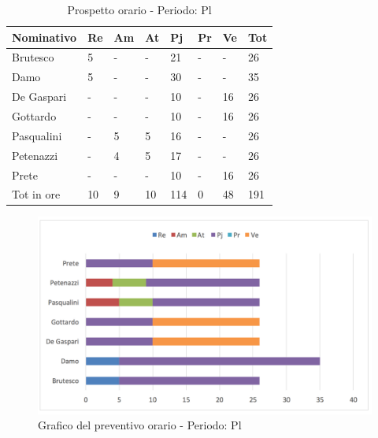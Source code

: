 							\begin{table}[H] \begin{center} \begin{tabular}{llllllll}
							\toprule
							\textbf{Nominativo}	&	\textbf{Re}	&	\textbf{Am}	&	\textbf{At}	&	\textbf{Pj}	&	\textbf{Pr}	&	\textbf{Ve}	&	\textbf{Tot}\\
							\midrule
							Brutesco	&	5	&	-	&	-	&	21	&	-	&	-	&	26	 \\
							Damo	&	5	&	-	&	-	&	30	&	-	&	-	&	35	 \\
							De Gaspari	&	-	&	-	&	-	&	10	&	-	&	16	&	26	 \\
							Gottardo	&	-	&	-	&	-	&	10	&	-	&	16	&	26	 \\
							Pasqualini	&	-	&	5	&	5	&	16	&	-	&	-	&	26	 \\
							Petenazzi	&	-	&	4	&	5	&	17	&	-	&	-	&	26	 \\
							Prete	&	-	&	-	&	-	&	10	&	-	&	16	&	26	 \\
							\midrule
							Tot in ore	&	10	&	9	&	10	&	114	&	0	&	48	&	191	 \\



							\bottomrule
							\end{tabular} \end{center} \caption{Prospetto orario - Periodo:
							Pl
							}\label{tab:h_Pl} \end{table}		\begin{figure}[H]  \centering  \includegraphics[scale=0.43]{img/h_Pl}
									\caption{Grafico del preventivo orario - Periodo: Pl}  \label{fig:h_Pl"} 		\end{figure}



